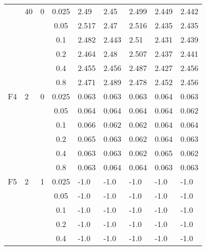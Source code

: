 \begin{longtable}{|l|l|l|c|l|l|l|l|l|}
\cmidrule{2-9} & 40  & 0        & 0.025          & 2.49       & 2.45       & 2.499      & 2.449      & 2.442      \\
\cmidrule{4-9} &     &          & 0.05           & 2.517      & 2.47       & 2.516      & 2.435      & 2.435      \\
\cmidrule{4-9} &     &          & 0.1            & 2.482      & 2.443      & 2.51       & 2.431      & 2.439      \\
\cmidrule{4-9} &     &          & 0.2            & 2.464      & 2.48       & 2.507      & 2.437      & 2.441      \\
\cmidrule{4-9} &     &          & 0.4            & 2.455      & 2.456      & 2.487      & 2.427      & 2.456      \\
\cmidrule{4-9} &     &          & 0.8            & 2.471      & 2.489      & 2.478      & 2.452      & 2.456      \\ \midrule
F4             & 2   & 0        & 0.025          & 0.063      & 0.063      & 0.063      & 0.064      & 0.063      \\
\cmidrule{4-9} &     &          & 0.05           & 0.064      & 0.064      & 0.064      & 0.064      & 0.062      \\
\cmidrule{4-9} &     &          & 0.1            & 0.066      & 0.062      & 0.062      & 0.064      & 0.064      \\
\cmidrule{4-9} &     &          & 0.2            & 0.065      & 0.063      & 0.062      & 0.064      & 0.063      \\
\cmidrule{4-9} &     &          & 0.4            & 0.063      & 0.063      & 0.062      & 0.065      & 0.062      \\
\cmidrule{4-9} &     &          & 0.8            & 0.063      & 0.064      & 0.064      & 0.063      & 0.063      \\ \midrule
F5             & 2   & 1        & 0.025          & -1.0       & -1.0       & -1.0       & -1.0       & -1.0       \\
\cmidrule{4-9} &     &          & 0.05           & -1.0       & -1.0       & -1.0       & -1.0       & -1.0       \\
\cmidrule{4-9} &     &          & 0.1            & -1.0       & -1.0       & -1.0       & -1.0       & -1.0       \\
\cmidrule{4-9} &     &          & 0.2            & -1.0       & -1.0       & -1.0       & -1.0       & -1.0       \\
\cmidrule{4-9} &     &          & 0.4            & -1.0       & -1.0       & -1.0       & -1.0       & -1.0       \\

\end{longtable}
